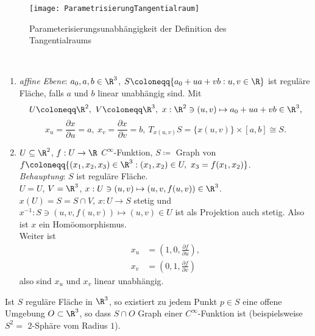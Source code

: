\begin{figure}[H]
  \texttt{[image: ParametrisierungTangentialraum]}
  \caption{Parameterisierungsunabhängigkeit der Definition des Tangentialraums}
\end{figure}

\begin{example}
  \
  \begin{enumerate}
    \item \emph{affine Ebene}: \( a_0, a, b \in \R^3 \), \( S \coloneqq \{ a_0 + ua + vb : u,v \in \R \} \) ist reguläre Fläche, falls \( a \) und \( b \) linear unabhängig sind. Mit
    \begin{equation*}
      U \coloneqq \R^2, \ V \coloneqq \R^3, \ x: \R^2 \ni (u,v) \mapsto a_0 + ua + vb \in \R^3\text{,}
    \end{equation*}
    \begin{equation*}
      x_u  =\frac{\partial x}{\partial u} = a, \ x_v = \frac{\partial x}{\partial v} = b, \ T_{x(u,v)}S = \{ x(u,v) \} \times [a,b] \cong S\text{.}
    \end{equation*}

    \item \( U \subseteq \R^2 \), \( f: U \to \R \) \( C^\infty \)-Funktion, \( S \coloneqq \) Graph von \( f \coloneqq \{ (x_1, x_2, x_3) \in \R^3 : (x_1, x_2) \in U, \ x_3 = f(x_1, x_2) \} \). \\
    \emph{Behauptung}: \( S \) ist reguläre Fläche. \\
    \( U = U \), \( V = \R^3 \), \( x : U \ni (u,v) \mapsto (u,v, f(u,v)) \in \R^3 \). \\
    \( x(U) = S = S \cap V \), \( x: U \to S \) stetig und \( x^{-1}: S \ni (u,v,f(u,v)) \mapsto (u,v) \in U \) ist als Projektion auch stetig. Also ist \( x \) ein Homöomorphismus. \\
    Weiter ist
    \begin{align*}
      x_u &= \left(1,0, \frac{\partial f}{\partial u}\right), \\
      x_v &= \left( 0,1, \frac{\partial f}{\partial v} \right)
    \end{align*}
    also sind \( x_u \) und \( x_v \) linear unabhängig.
  \end{enumerate}
\end{example}

\begin{remark}
  Ist \( S \) reguläre Fläche in \( \R^3 \), so existiert zu jedem Punkt \( p \in S \) eine offene Umgebung \( O \subset \R^3 \), so dass \( S \cap O \) Graph einer \( C^\infty \)-Funktion ist (beispielsweise \( S^2 = \) 2-Sphäre vom Radius \( 1 \)).
\end{remark}


